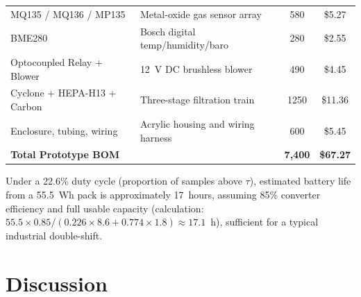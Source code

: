 \documentclass[12pt,a4paper]{article}
\begin{document}
\begin{table}[htbp]
\begin{tabular}{@{}p{5.2cm}p{3.8cm}cc@{}}
MQ135 / MQ136 / MP135 & Metal-oxide gas sensor array   & 580  & \$5.27 \\
BME280              & Bosch digital temp/humidity/baro & 280  & \$2.55 \\
Optocoupled Relay + Blower & 12~V DC brushless blower & 490  & \$4.45 \\
Cyclone + HEPA-H13 + Carbon & Three-stage filtration train & 1250 & \$11.36 \\
Enclosure, tubing, wiring & Acrylic housing and wiring harness & 600  & \$5.45 \\
\textbf{Total Prototype BOM} &                               & \textbf{7,400} & \textbf{\$67.27} \\
\bottomrule
\end{tabular}
\end{table}

Under a 22.6\% duty cycle (proportion of samples above $\tau$), estimated battery life
from a 55.5~Wh pack is approximately 17~hours, assuming 85\% converter efficiency and
full usable capacity (calculation: $55.5 \times 0.85 / (0.226 \times 8.6 + 0.774 \times 1.8)
\approx 17.1$~h), sufficient for a typical industrial double-shift.


\section{Discussion}
\label{sec:discussion}
\end{document}
